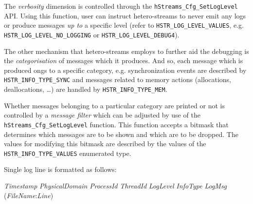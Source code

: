\documentclass[a4,oneside]{book}
\begin{document}
The \emph{verbosity} dimension is controlled through the \texttt{hStreams\_Cfg\_SetLogLevel} API.
Using this function, user can instruct hetero-streams to never emit any logs or produce messages \emph{up to} a specific level (refer to \texttt{HSTR\_LOG\_LEVEL\_VALUES}, e.g. \texttt{HSTR\_LOG\_LEVEL\_NO\_LOGGING} or \texttt{HSTR\_LOG\_LEVEL\_DEBUG4}).

The other mechanism that hetero-streams employs to further aid the debugging is the \emph{categorisation} of messages which it produces.
And so, each message which is produced ongs to a specific category, e.g. synchronization events are described by \texttt{HSTR\_INFO\_TYPE\_SYNC} and messages related to memory actions (allocations, deallocations, \ldots) are handled by \texttt{HSTR\_INFO\_TYPE\_MEM}.

Whether messages belonging to a particular category are printed or not is controlled by a \emph{message filter} which can be adjusted by use of the \texttt{hStreams\_Cfg\_SetLogLevel} function.
This function accepts a bitmask that determines which messages are to be shown and which are to be dropped.
The values for modifying this bitmask are described by the values of the \texttt{HSTR\_INFO\_TYPE\_VALUES} enumerated type.

Single log line is formatted as follows:

\emph{Timestamp} \emph{PhysicalDomain} \emph{ProcessId} \emph{ThreadId} \emph{LogLevel} \emph{InfoType} \emph{LogMsg} (\emph{FileName}:\emph{Line})

\iffalse
Uncomment if needed

\begin{itemize}
    \item \emph{Timestamp} is number of milliseconds from linux epoch.
    \item \emph{PhysicalDomain} is number of physical domain.
    \item \emph{ProcessId} is id of process which made call to hStreams function.
    \item \emph{ThreadId} is id of thread which made call to hStreams function.
    \item \emph{LogLevel} is one of \texttt{HSTR\_LOG\_LEVEL\_VALUES}
    \item \emph{InfoType} is one of \texttt{HSTR\_INFO\_TYPE\_VALUES}
    \item \emph{LogMsg} is log message.
    \item \emph{FileName} is name of file from which log message comes from.
    \item \emph{Line} is line number in \emph{FileName} from which log message comes from.
\end{itemize}
\fi
\end{document}
